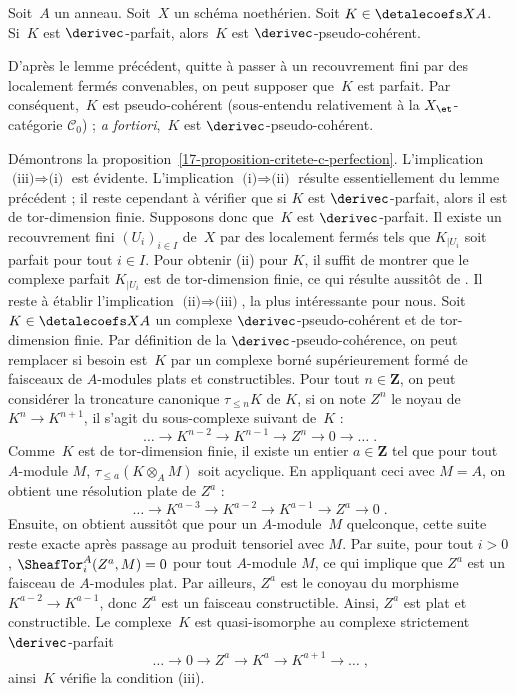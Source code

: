 \documentclass[10pt]{../fichiers-configuration-latex/smfart}
\begin{document}
\begin{lemme2}
Soit $A$ un anneau. Soit $X$ un schéma noethérien. Soit $K\in\detalecoefs X A$.
Si $K$ est $\derivec$-parfait, alors $K$ est $\derivec$-pseudo-cohérent.
\end{lemme2}

D'après le lemme précédent, quitte à passer à un recouvrement fini par des
localement fermés convenables, on peut supposer que $K$ est parfait.
Par conséquent, $K$ est pseudo-cohérent (sous-entendu relativement à la
$X_\et$-catégorie $\mathscr C_0$) ; \emph{a fortiori}, $K$ est
$\derivec$-pseudo-cohérent.

\bigskip

Démontrons la proposition~\ref{17-proposition-critete-c-perfection}.
L'implication $\text{(iii)}\Longrightarrow\text{(i)}$ est évidente.
L'implication $\text{(i)}\Longrightarrow\text{(ii)}$ résulte
essentiellement du lemme précédent ; il reste cependant à vérifier que si
$K$ est $\derivec$-parfait, alors il est de tor-dimension finie. Supposons
donc que $K$ est $\derivec$-parfait. Il existe un recouvrement fini
$(U_i)_{i\in I}$ de $X$ par des localement fermés tels que $K_{|U_i}$ soit
parfait pour tout $i\in I$. Pour obtenir (ii) pour $K$, il suffit de
montrer que le complexe parfait $K_{|U_i}$ est de tor-dimension finie, ce
qui résulte aussitôt de . Il reste à établir l'implication
$\text{(ii)}\Longrightarrow\text{(iii)}$, la plus intéressante pour nous.
Soit $K\in \detalecoefs X A$ un complexe $\derivec$-pseudo-cohérent
et de tor-dimension finie.
Par définition de la $\derivec$-pseudo-cohérence,
on peut remplacer si besoin est $K$ par un
complexe borné supérieurement formé de faisceaux de $A$-modules plats et
constructibles.
Pour tout $n\in\mathbf{Z}$, on peut considérer la troncature canonique
$\tau_{\leq n}K$ de $K$, si on note $Z^n$ le noyau de $K^n\to K^{n+1}$, il
s'agit du sous-complexe suivant de $K$ :
\[\dots \to K^{n-2} \to K^{n-1} \to Z^n \to 0\to \dots\;\text{.}\]
Comme $K$ est de tor-dimension finie, il existe un entier $a\in\mathbf{Z}$
tel que pour tout $A$-module $M$, $\tau_{\leq a}(K\otimes_A M)$ soit
acyclique. En appliquant ceci avec $M=A$, on obtient une résolution plate
de $Z^a$ :
\[\dots\to K^{a-3}\to K^{a-2}\to K^{a-1}\to Z^a \to 0\;\text{.}\]
Ensuite, on obtient aussitôt que pour un $A$-module $M$ quelconque, cette
suite reste exacte après passage au produit tensoriel avec $M$. Par suite,
pour tout $i>0$, $\SheafTor_i^A(Z^a,M)=0$ pour tout $A$-module $M$,
ce qui implique que $Z^a$ est un faisceau de $A$-modules plat. Par
ailleurs, $Z^a$ est le conoyau du morphisme $K^{a-2}\to K^{a-1}$, donc
$Z^a$ est un faisceau constructible. Ainsi, $Z^a$ est plat et constructible.
Le complexe $K$ est quasi-isomorphe au complexe
strictement $\derivec$-parfait
\[\dots \to 0\to Z^a \to K^a \to K^{a+1} \to \dots\;\text{,}\]
ainsi $K$ vérifie la condition (iii).
\end{document}

